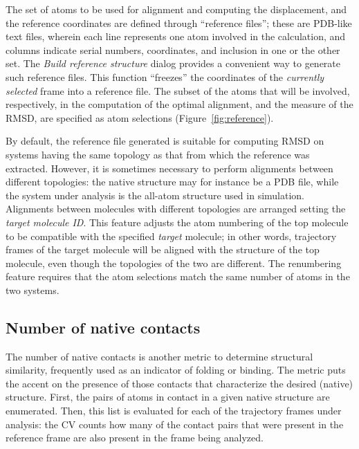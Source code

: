 \documentclass[preprint,12pt]{elsarticle}
\begin{document}
The set of atoms to be used for alignment and computing the
displacement, and the reference coordinates are defined through
``reference files''; these are PDB-like text files, wherein each line
represents one atom involved in the calculation, and columns indicate
serial numbers, coordinates, and inclusion in one or the other set.
The \emph{Build reference structure} dialog
 provides a convenient way to generate
such reference files.  This function ``freezes'' the coordinates of the
\emph{currently selected} frame into a reference file. The subset of
the atoms that will be involved, respectively, in the computation of
the optimal alignment, and the measure of the RMSD, are specified as
atom selections (Figure~\ref{fig:reference}).


By default, the reference file generated is suitable for computing
RMSD on systems having the same topology as that from which the
reference was extracted.  However, it is sometimes necessary to
perform alignments between different topologies: the native structure
may for instance be a PDB file, while the system under analysis is the
all-atom structure used in simulation. Alignments between molecules
with different topologies are arranged setting the \emph{target
  molecule ID}. This feature adjusts the atom numbering of the top
molecule to be compatible with the specified \emph{target} molecule;
in other words, trajectory frames of the target molecule will be
aligned with the structure of the top molecule, even though the
topologies of the two are different. The renumbering feature requires
that the atom selections match the same number of atoms in the two
systems.





\subsection{Number of native contacts}

The number of native contacts is another metric  to
determine structural similarity, frequently used as an indicator of folding
or binding.  The metric puts the accent on the presence of those
contacts that characterize the desired (native) structure. First, the
pairs of atoms in contact in a given native structure are
enumerated. Then, this list is evaluated
for each of the trajectory frames under analysis: the 
CV counts how many of the contact pairs that were present in the
reference frame are also present in the frame being analyzed.  
\end{document}
